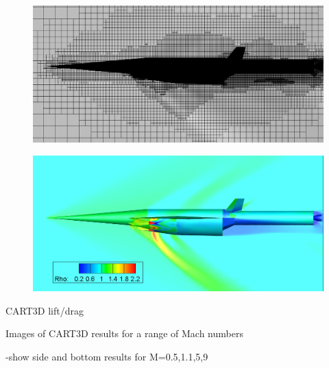 		\begin{figure}
\centering
\includegraphics[width=0.7\linewidth]{figures/3_vehicle_design/CARTmesh}
\caption{}
\label{fig:CARTmesh}
\end{figure}
\begin{figure}
\centering
\includegraphics[width=0.7\linewidth]{figures/3_vehicle_design/CARTcontour}
\caption{}
\label{fig:CARTcontour}
\end{figure}


CART3D lift/drag 

Images of CART3D results for a range of Mach numbers



-show side and bottom results for M=0.5,1.1,5,9

